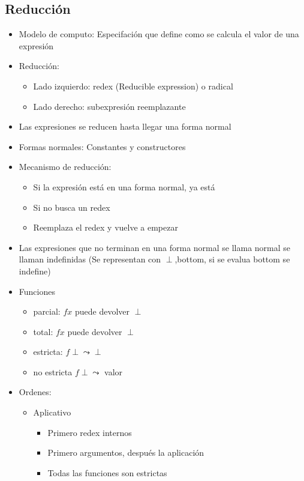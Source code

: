 \documentclass[a4paper,10pt]{article}
\begin{document}
\subsection{Reducción}
    \begin{itemize}
	\item Modelo de computo: Especifación que define como se calcula el valor de una expresión
	\item Reducción:
	\begin{itemize}
	    \item Lado izquierdo: redex (Reducible expression) o radical
	    \item Lado derecho: subexpresión reemplazante
	\end{itemize}
	\item Las expresiones se reducen hasta llegar una forma normal
	\item Formas normales: Constantes y constructores
	\item Mecanismo de reducción: 
	\begin{itemize}
	    \item Si la expresión está en una forma normal, ya está
	    \item Si no busca un redex
	    \item Reemplaza el redex y vuelve a empezar
	\end{itemize}
	\item Las expresiones que no terminan en una forma normal se llama normal se llaman indefinidas (Se representan con $\perp$,bottom, si se evalua bottom se indefine)
	\item Funciones
	\begin{itemize}
	    \item parcial: $f x$ puede devolver $\perp$
	    \item total: $f x$ puede devolver $\perp$
	    \item estricta: $f \perp \leadsto \perp$
	    \item no estricta $f \perp \leadsto$ valor
	\end{itemize}
	\item Ordenes:
	\begin{itemize}
	    \item Aplicativo
	    \begin{itemize}
		\item Primero redex internos
		\item Primero argumentos, después la aplicación
		\item Todas las funciones son estrictas
	    \end{itemize}

\end{itemize}
\end{itemize}
\end{document}
